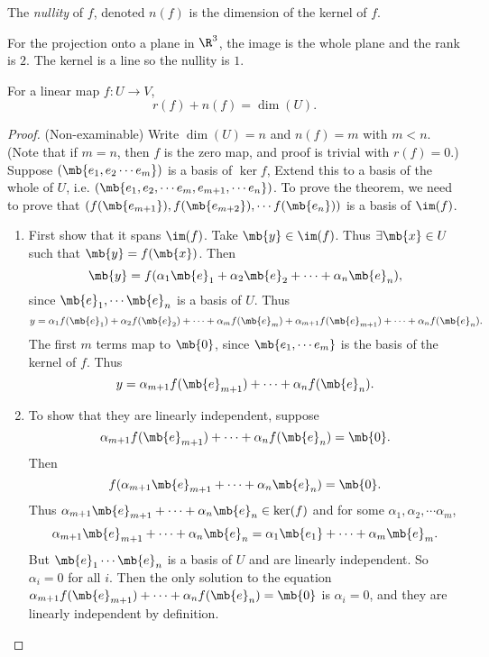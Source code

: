 \documentclass[a4paper]{article}
\begin{document}
\begin{defi}
  The \emph{nullity} of $f$, denoted $n(f)$ is the dimension of the kernel of $f$.
\end{defi}

\begin{eg}
  For the projection onto a plane in $\R^3$, the image is the whole plane and the rank is $2$. The kernel is a line so the nullity is $1$.
\end{eg}

\begin{thm}
  For a linear map $f: U \to V$,
  \[
  r(f) + n(f) = \dim (U).
  \]
\end{thm}

\begin{proof}
  (Non-examinable) Write $\dim(U) = n$ and $n(f) = m$ with $m < n$. (Note that if $m = n$, then $f$ is the zero map, and proof is trivial with $r(f) = 0$.) Suppose $(\mb{e_1, e_2\cdots e_m})$ is a basis of $\ker f$, Extend this to a basis of the whole of $U$, i.e. $(\mb{e_1, e_2, \cdots e_m, e_{m+1}, \cdots e_n})$. To prove the theorem, we need to prove that $(f(\mb{e_{m+1}}), f(\mb{e_{m + 2}}), \cdots f({\mb{e_n}}))$ is a basis of $\im (f)$.
    \begin{enumerate}
      \item First show that it spans $\im (f)$. Take $\mb{y}\in \im(f)$. Thus $\exists \mb{x}\in U$ such that $\mb{y} = f(\mb{x})$. Then
        \[
        \mb{y} = f(\alpha_1\mb{e}_1 + \alpha_2\mb{e}_2 + \cdots + \alpha_n \mb{e}_n),
        \]
        since $\mb{e}_1, \cdots \mb{e}_n$ is a basis of $U$. Thus
        \[
        y = \alpha_1f(\mb{e}_1) + \alpha_2f(\mb{e}_2) + \cdots + \alpha_m f(\mb{e}_m) + \alpha_{m + 1}f(\mb{e}_{m + 1}) + \cdots + \alpha_nf(\mb{e}_n).
        \]
        The first $m$ terms map to $\mb{0}$, since $\mb{e_1, \cdots e_m}$ is the basis of the kernel of $f$. Thus
        \[
        y = \alpha_{m + 1} f(\mb{e}_{m + 1}) + \cdots + \alpha_n f(\mb{e}_n).
        \]
      \item To show that they are linearly independent, suppose
        \[
        \alpha_{m + 1} f(\mb{e}_{m + 1}) + \cdots + \alpha_n f(\mb{e}_n) = \mb{0}.
        \]
        Then 
        \[
        f(\alpha_{m + 1}\mb{e}_{m + 1} + \cdots + \alpha_n\mb{e}_n) = \mb{0}.
        \]
        Thus $\alpha_{m + 1}\mb{e}_{m + 1} + \cdots + \alpha_n\mb{e}_n\in \ker (f)$ and for some $\alpha_1, \alpha_2, \cdots \alpha_m$, 
        \[
        \alpha_{m + 1}\mb{e}_{m + 1} + \cdots + \alpha_n\mb{e}_n = \alpha_1\mb{e_1} + \cdots + \alpha_m\mb{e}_m.
        \]
        But $\mb{e}_1\cdots \mb{e}_n$ is a basis of $U$ and are linearly independent. So $\alpha_i = 0$ for all $i$. Then the only solution to the equation $\alpha_{m + 1} f(\mb{e}_{m + 1}) + \cdots + \alpha_n f(\mb{e}_n) = \mb{0}$ is $\alpha_i = 0$, and they are linearly independent by definition.
    \end{enumerate}
\end{proof}
\end{document}
